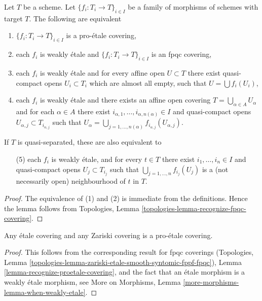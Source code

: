\begin{lemma}
\label{lemma-recognize-proetale-covering}
Let $T$ be a scheme. Let $\{f_i : T_i \to T\}_{i \in I}$ be a family of
morphisms of schemes with target $T$. The following are equivalent
\begin{enumerate}
\item $\{f_i : T_i \to T\}_{i \in I}$ is a pro-\'etale covering,
\item each $f_i$ is weakly \'etale and $\{f_i : T_i \to T\}_{i \in I}$
is an fpqc covering,
\item each $f_i$ is weakly \'etale and for every affine open $U \subset T$
there exist quasi-compact opens $U_i \subset T_i$ which are almost all empty,
such that $U = \bigcup f_i(U_i)$,
\item each $f_i$ is weakly \'etale and there exists an affine open covering
$T = \bigcup_{\alpha \in A} U_\alpha$ and for each $\alpha \in A$
there exist $i_{\alpha, 1}, \ldots, i_{\alpha, n(\alpha)} \in I$
and quasi-compact opens $U_{\alpha, j} \subset T_{i_{\alpha, j}}$ such that
$U_\alpha =
\bigcup_{j = 1, \ldots, n(\alpha)} f_{i_{\alpha, j}}(U_{\alpha, j})$.
\end{enumerate}
If $T$ is quasi-separated, these are also equivalent to
\begin{enumerate}
\item[(5)] each $f_i$ is weakly \'etale, and for every $t \in T$ there exist
$i_1, \ldots, i_n \in I$ and quasi-compact opens $U_j \subset T_{i_j}$
such that $\bigcup_{j = 1, \ldots, n} f_{i_j}(U_j)$ is a
(not necessarily open) neighbourhood of $t$ in $T$.
\end{enumerate}
\end{lemma}

\begin{proof}
The equivalence of (1) and (2) is immediate from the definitions.
Hence the lemma follows from
Topologies, Lemma \ref{topologies-lemma-recognize-fpqc-covering}.
\end{proof}

\begin{lemma}
\label{lemma-etale-proetale}
Any \'etale covering and any Zariski covering is a pro-\'etale covering.
\end{lemma}

\begin{proof}
This follows from the corresponding result for fpqc coverings
(Topologies, Lemma
\ref{topologies-lemma-zariski-etale-smooth-syntomic-fppf-fpqc}),
Lemma \ref{lemma-recognize-proetale-covering}, and
the fact that an \'etale morphism is a weakly \'etale morphism, see
More on Morphisms, Lemma \ref{more-morphisms-lemma-when-weakly-etale}.
\end{proof}

